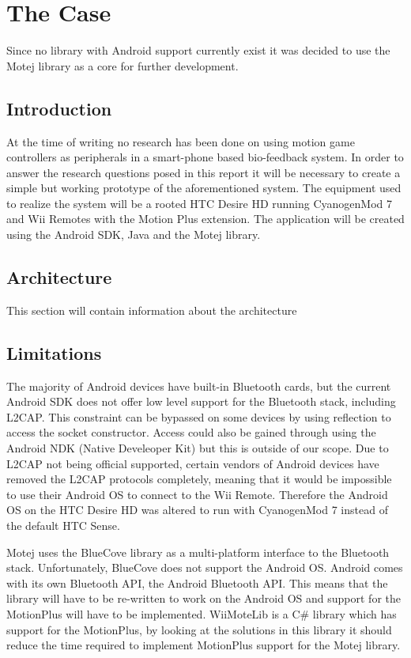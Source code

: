 \chapter{The Case}
Since no library with Android support currently exist it was decided to use the Motej library as a core for further development.

\section{Introduction}
At the time of writing no research has been done on using motion game controllers as peripherals in a smart-phone based bio-feedback system. In order to answer the research questions posed in this report it will be necessary to create a simple but working prototype of the aforementioned system. The equipment used to realize the system will be a rooted HTC Desire HD \cite{desireHdSpecs} running CyanogenMod 7 \cite{cyanogenMod} and Wii Remotes with the Motion Plus extension. The application will be created using the Android SDK, Java and the Motej library.


\section{Architecture}
This section will contain information about the architecture

\section{Limitations}
The majority of Android devices have built-in Bluetooth cards, but the current Android SDK does not offer low level support for the Bluetooth stack, including L2CAP. This constraint can be bypassed on some devices by using reflection to access the socket constructor\cite{l2capHtc}. Access could also be gained through using the Android NDK (Native Develeoper Kit) but this is outside of our scope. Due to L2CAP not being official supported, certain vendors of Android devices have removed the L2CAP protocols completely, meaning that it would be impossible to use their Android OS to connect to the Wii Remote. Therefore the Android OS on the HTC Desire HD was altered to run with CyanogenMod 7 instead of the default HTC Sense.

Motej uses the BlueCove library as a multi-platform interface to the Bluetooth stack. Unfortunately, BlueCove does not support the Android OS. Android comes with its own Bluetooth API, the Android Bluetooth API. This means that the library will have to be re-written to work on the Android OS and support for the MotionPlus will have to be implemented. WiiMoteLib\cite{wiiMoteLib} is a C\# library which has support for the MotionPlus, by looking at the solutions in this library it should reduce the time required to implement MotionPlus support for the Motej library.

